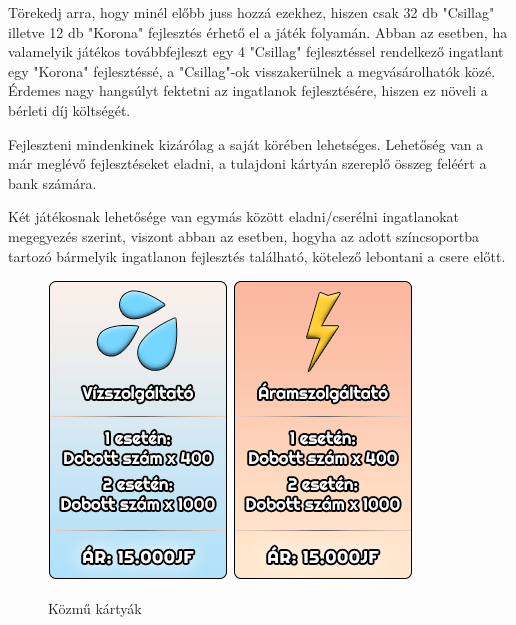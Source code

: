 Törekedj arra, hogy minél előbb juss hozzá ezekhez, hiszen csak 32 db "Csillag" illetve 12 db "Korona" fejlesztés érhető el a játék folyamán. Abban az esetben, ha valamelyik játékos továbbfejleszt egy 4 "Csillag" fejlesztéssel rendelkező ingatlant egy "Korona" fejlesztéssé, a "Csillag"-ok visszakerülnek a megvásárolhatók közé. Érdemes nagy hangsúlyt fektetni az ingatlanok fejlesztésére, hiszen ez növeli a bérleti díj költségét.

Fejleszteni mindenkinek kizárólag a saját körében lehetséges.
Lehetőség van a már meglévő fejlesztéseket eladni, a tulajdoni kártyán szereplő összeg feléért a bank számára.

Két játékosnak lehetősége van egymás között eladni/cserélni ingatlanokat megegyezés szerint, viszont abban az esetben, hogyha az adott színcsoportba tartozó bármelyik ingatlanon fejlesztés található, kötelező lebontani a csere előtt.


\begin{figure}[h!]
\centering
\includegraphics[scale=0.4]{images/vsz.png}
\includegraphics[scale=0.4]{images/asz.png}
\caption{Közmű kártyák}
\label{fig:ff}
\end{figure}

